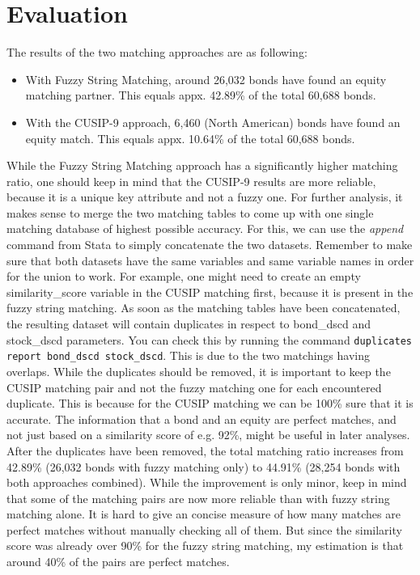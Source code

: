 \section{Evaluation} \label{section:matching-evaluation}
The results of the two matching approaches are as following: 
\begin{itemize}
	\item With Fuzzy String Matching, around 26,032 bonds have found an equity matching partner. This equals appx. 42.89\% of the total 60,688 bonds. 
	\item With the CUSIP-9 approach, 6,460 (North American) bonds have found an equity match. This equals appx. 10.64\% of the total 60,688 bonds. 
\end{itemize}
While the Fuzzy String Matching approach has a significantly higher matching ratio, one should keep in mind that the CUSIP-9 results are more reliable, because it is a unique key attribute and not a fuzzy one. For further analysis, it makes sense to merge the two matching tables to come up with one single matching database of highest possible accuracy. For this, we can use the \textit{append} command from Stata to simply concatenate the two datasets. Remember to make sure that both datasets have the same variables and same variable names in order for the union to work. For example, one might need to create an empty similarity\_score variable in the CUSIP matching first, because it is present in the fuzzy string matching. %
As soon as the matching tables have been concatenated, the resulting dataset will contain duplicates in respect to bond\_dscd and stock\_dscd parameters. You can check this by running the command \lstinline|duplicates report bond_dscd stock_dscd|. This is due to the two matchings having overlaps. While the duplicates should be removed, it is important to keep the CUSIP matching pair and not the fuzzy matching one for each encountered duplicate. This is because for the CUSIP matching we can be 100\% sure that it is accurate. The information that a bond and an equity are perfect matches, and not just based on a similarity score of e.g. 92\%, might be useful in later analyses. 
After the duplicates have been removed, %
the total matching ratio increases from 42.89\% (26,032 bonds with fuzzy matching only) to 44.91\% (28,254 bonds with both approaches combined). While the improvement is only minor, keep in mind that some of the matching pairs are now more reliable than with fuzzy string matching alone. It is hard to give an concise measure of how many matches are perfect matches without manually checking all of them. But since the similarity score was already over 90\% for the fuzzy string matching, my estimation is that around 40\% of the pairs are perfect matches. 








